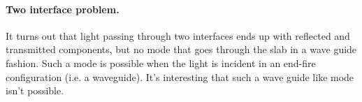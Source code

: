 %
%

\renewcommand{\basename}{emt10}
\renewcommand{\dirname}{notes/ece1228/}
\newcommand{\keywords}{ECE1228H}

%
\usepackage{peeters_braket}
\usepackage{peeters_figures}
\usepackage{mathtools}
\usepackage{siunitx}
\usepackage{macros_bm}
%
\beginArtNoToc
{}
\label{chap:emt10}
%
\paragraph{Two interface problem.}
%
It turns out that light passing through two interfaces ends up with reflected and transmitted components, but no mode that goes through the slab in a wave guide fashion.  Such a mode is possible when the light is incident in an end-fire configuration (i.e. a waveguide).  It's interesting that such a wave guide like mode isn't possible.
%
